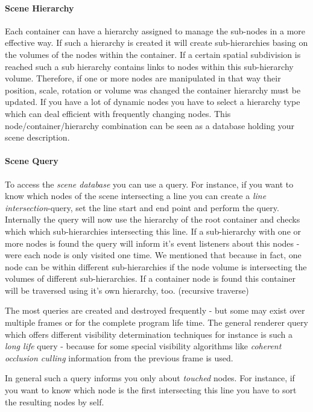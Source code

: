 \paragraph{Scene Hierarchy}
Each container can have a hierarchy assigned to manage the sub-nodes in a more effective way. If such a hierarchy is created it will create sub-hierarchies basing on the volumes of the nodes within the container. If a certain spatial subdivision is reached such a sub hierarchy contains links to nodes within this sub-hierarchy volume. Therefore, if one or more nodes are manipulated in that way their position, scale, rotation or volume was changed the container hierarchy must be updated. If you have a lot of dynamic nodes you have to select a hierarchy type which can deal efficient with frequently changing nodes. This node/container/hierarchy combination can be seen as a database holding your scene description.


\paragraph{Scene Query}
To access the \emph{scene database} you can use a query. For instance, if you want to know which nodes of the scene intersecting a line you can create a \emph{line intersection}-query, set the line start and end point and perform the query. Internally the query will now use the hierarchy of the root container and checks which which sub-hierarchies intersecting this line. If a sub-hierarchy with one or more nodes is found the query will inform it's event listeners about this nodes - were each node is only visited one time. We mentioned that because in fact, one node can be within different sub-hierarchies if the node volume is intersecting the volumes of different sub-hierarchies. If a container node is found this container will be traversed using it's own hierarchy, too. (recursive traverse)

The most queries are created and destroyed frequently - but some may exist over multiple frames or for the complete program life time. The general renderer query which offers different visibility determination techniques for instance is such a \emph{long life} query - because for some special visibility algorithms like \emph{coherent occlusion culling} information from the previous frame is used.

In general such a query informs you only about \emph{touched} nodes. For instance, if you want to know which node is the first intersecting this line you have to sort the resulting nodes by self.


